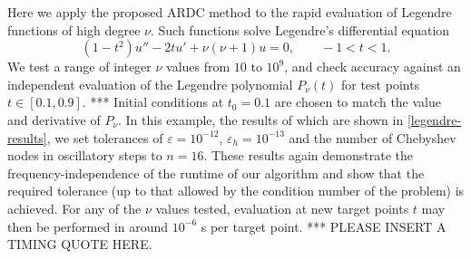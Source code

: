 \documentclass[10pt]{article}
\newcommand{\be}{\begin{equation}}
\newcommand{\ee}{\end{equation}}
\newcommand{\ie}{{\it i.e.\ }}
\newcommand{\bigO}{{\mathcal O}}
\begin{document}
Here we apply the proposed ARDC method to the rapid evaluation of
Legendre functions of high degree $\nu$.
Such functions solve Legendre's differential equation
\cite[Sec.~14.2]{dlmf}
\be\label{legendreode}
(1-t^2)u'' - 2tu' + \nu(\nu+1)u = 0 ,       \qquad -1<t<1.
\ee
We test a range of integer $\nu$ values from $10$ to $10^9$,
and check accuracy against an independent
evaluation of the Legendre polynomial $P_\nu(t)$
for test points $t \in [0.1, 0.9]$.
*** Initial conditions at $t_0=0.1$ are chosen to match the value
and derivative of $P_\nu$.
%
In this example,
the results of which are shown in \cref{legendre-results}, we set tolerances of
$\varepsilon = 10^{-12}$, $\varepsilon_h = 10^{-13}$ and the number of
Chebyshev nodes in oscillatory steps to $n = 16$.
These results again demonstrate the frequency-independence of the runtime of
our algorithm and show that the required tolerance (up to that allowed by the
condition number
of the problem) is achieved.
For any of the $\nu$ values tested, evaluation at new target points $t$ may
then be performed in around $10^{-6}$ s per target point.
*** PLEASE INSERT A TIMING QUOTE HERE.



\begin{table}
    \renewcommand{\arraystretch}{1.2}
    \resizebox{\textwidth}{!}{}
    \caption{Accuracy, runtime and evaluation statistics of the proposed ARDC method when
      applied to Legendre functions via their ODE \cref{legendreode}.
      The degree is $\nu$; other column
      headers are identical to those in \cref{bremer237tab}
      and are explained in the text. \label{legendre-results}}
\end{table}
\end{document}
